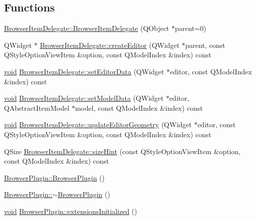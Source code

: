 \subsection*{\-Functions}
\begin{DoxyCompactItemize}
\item 
\hyperlink{group___u_a_v_object_browser_plugin_gacfb0653f39791c3fb6b7b59ce4de990c}{\-Browser\-Item\-Delegate\-::\-Browser\-Item\-Delegate} (\-Q\-Object $\ast$parent=0)
\item 
\-Q\-Widget $\ast$ \hyperlink{group___u_a_v_object_browser_plugin_ga16c2a6f63557c8fe5ade68a4b8f43009}{\-Browser\-Item\-Delegate\-::create\-Editor} (\-Q\-Widget $\ast$parent, const \-Q\-Style\-Option\-View\-Item \&option, const \-Q\-Model\-Index \&index) const 
\item 
\hyperlink{group___u_a_v_objects_plugin_ga444cf2ff3f0ecbe028adce838d373f5c}{void} \hyperlink{group___u_a_v_object_browser_plugin_ga07845c2f048ab9c2344102bbfb627b01}{\-Browser\-Item\-Delegate\-::set\-Editor\-Data} (\-Q\-Widget $\ast$editor, const \-Q\-Model\-Index \&index) const 
\item 
\hyperlink{group___u_a_v_objects_plugin_ga444cf2ff3f0ecbe028adce838d373f5c}{void} \hyperlink{group___u_a_v_object_browser_plugin_ga14d19cdeeb41b7891318f803d87fa585}{\-Browser\-Item\-Delegate\-::set\-Model\-Data} (\-Q\-Widget $\ast$editor, \-Q\-Abstract\-Item\-Model $\ast$model, const \-Q\-Model\-Index \&index) const 
\item 
\hyperlink{group___u_a_v_objects_plugin_ga444cf2ff3f0ecbe028adce838d373f5c}{void} \hyperlink{group___u_a_v_object_browser_plugin_gaf2e600876c101b4bf562057c6aeeade1}{\-Browser\-Item\-Delegate\-::update\-Editor\-Geometry} (\-Q\-Widget $\ast$editor, const \-Q\-Style\-Option\-View\-Item \&option, const \-Q\-Model\-Index \&index) const 
\item 
\-Q\-Size \hyperlink{group___u_a_v_object_browser_plugin_gaed46b06e0a245805247c1be3c62f97ee}{\-Browser\-Item\-Delegate\-::size\-Hint} (const \-Q\-Style\-Option\-View\-Item \&option, const \-Q\-Model\-Index \&index) const 
\item 
\hyperlink{group___u_a_v_object_browser_plugin_ga63db697e4bb11742d9d946ca7c08fb7a}{\-Browser\-Plugin\-::\-Browser\-Plugin} ()
\item 
\hyperlink{group___u_a_v_object_browser_plugin_ga35e9b6db09f29a19459f9012c2251980}{\-Browser\-Plugin\-::$\sim$\-Browser\-Plugin} ()
\item 
\hyperlink{group___u_a_v_objects_plugin_ga444cf2ff3f0ecbe028adce838d373f5c}{void} \hyperlink{group___u_a_v_object_browser_plugin_gabd7f5c6dac73c173cebd4e59dbc99182}{\-Browser\-Plugin\-::extensions\-Initialized} ()

\end{DoxyCompactItemize}
